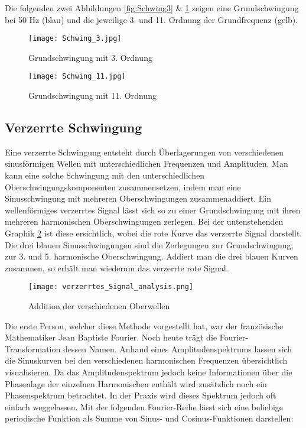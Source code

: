 Die folgenden zwei Abbildungen \ref{fig:Schwing3} \& \ref{fig:Schwing11} zeigen eine Grundschwingung bei 50 Hz (blau) und die jeweilige 3. und 11. Ordnung der Grundfrequenz (gelb).

\begin{figure}[ht!]
	\begin{minipage}[t]{0.49\textwidth}
		\centering
		\texttt{[image: Schwing\_3.jpg]}	
		\caption{Grundschwingung mit 3. Ordnung \cite{Oberwellen}}\label{fig:Schwing3}
	\end{minipage}	
	\begin{minipage}[t]{0.49\textwidth}	
		\centering	
		\texttt{[image: Schwing\_11.jpg]}	
		\caption{Grundschwingung mit 11. Ordnung \cite{Oberwellen}}\label{fig:Schwing11}
	\end{minipage}
\end{figure}
	


\subsection{Verzerrte Schwingung}\label{sec:Verzerrte_Schwingung}
Eine verzerrte Schwingung entsteht durch Überlagerungen von verschiedenen sinusförmigen Wellen mit unterschiedlichen Frequenzen und Amplituden. Man kann eine solche Schwingung mit den unterschiedlichen Oberschwingungskomponenten zusammensetzen, indem man eine Sinusschwingung mit mehreren Oberschwingungen zusammenaddiert. Ein wellenförmiges verzerrtes Signal lässt sich so zu einer Grundschwingung mit ihren mehreren harmonischen Oberschwingungen zerlegen. Bei der untenstehenden Graphik \ref{fig:Addition Oberwellen} ist diese ersichtlich, wobei die rote Kurve das verzerrte Signal darstellt. Die drei blauen Sinusschwingungen sind die Zerlegungen zur Grundschwingung, zur 3. und 5. harmonische Oberschwingung. Addiert man die drei blauen Kurven zusammen, so erhält man wiederum das verzerrte rote Signal.
\begin{figure}[ht!]
	\centering
	\texttt{[image: verzerrtes\_Signal\_analysis.png]}	
	\caption{Addition der verschiedenen Oberwellen \cite{analysi3}}\label{fig:Addition Oberwellen}
\end{figure}

Die erste Person, welcher diese Methode vorgestellt hat, war der französische Mathematiker Jean Baptiste Fourier. Noch heute trägt die Fourier-Transformation dessen Namen. Anhand eines Amplitudenspektrums lassen sich die Sinuskurven bei den verschiedenen harmonischen Frequenzen übersichtlich visualisieren. Da das Amplitudenspektrum jedoch keine Informationen über die Phasenlage der einzelnen Harmonischen enthält wird zusätzlich noch ein Phasenspektrum betrachtet. In der Praxis wird dieses Spektrum jedoch oft einfach weggelassen. Mit der folgenden Fourier-Reihe lässt sich eine beliebige periodische Funktion als Summe von Sinus- und Cosinus-Funktionen darstellen:

